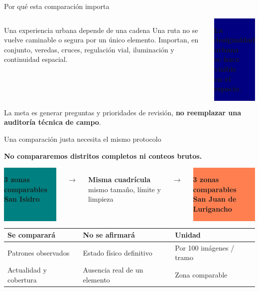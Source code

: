 \documentclass[aspectratio=169,10pt]{beamer}
\newcommand{\tagbox}[2]{\colorbox{#1}{\parbox[c][0.7cm][c]{0.92\linewidth}{\centering\color{white}\textbf{#2}}}}
\begin{document}
\begin{frame}{Por qué esta comparación importa}
\begin{columns}[T,onlytextwidth]
\begin{block}{Una experiencia urbana depende de una cadena}
Una ruta no se vuelve caminable o segura por un único elemento. Importan, en conjunto, veredas, cruces, regulación vial, iluminación y continuidad espacial.
\end{block}
\colorbox{navy}{\parbox[c][3.2cm][c]{0.95\linewidth}{\centering\color{white}\Large\textbf{La desigualdad urbana\\se hace visible\\en el espacio.}}}
\end{columns}
\vspace{0.55cm}
\begin{center}
\large La meta es generar preguntas y prioridades de revisión, \textbf{no reemplazar una auditoría técnica de campo}.
\end{center}
\end{frame}

\begin{frame}{Una comparación justa necesita el mismo protocolo}
\begin{center}\large\textbf{No compararemos distritos completos ni conteos brutos.}\end{center}
\vspace{0.35cm}
\begin{columns}[c,onlytextwidth]
\tagbox{teal}{3 zonas comparables\\San Isidro}
\centering\Large$\longrightarrow$
\colorbox{mist}{\parbox[c][1.35cm][c]{0.96\linewidth}{\centering\textbf{Misma cuadrícula}\\mismo tamaño, límite y limpieza}}
\centering\Large$\longrightarrow$
\tagbox{coral}{3 zonas comparables\\San Juan de Lurigancho}
\end{columns}
\vspace{0.65cm}
\begin{center}
\begin{tabular}{lll}
\toprule
\textbf{Se comparará} & \textbf{No se afirmará} & \textbf{Unidad} \\
\midrule
Patrones observados & Estado físico definitivo & Por 100 imágenes / tramo \\
Actualidad y cobertura & Ausencia real de un elemento & Zona comparable \\
\bottomrule
\end{tabular}
\end{center}
\end{frame}
\end{document}
